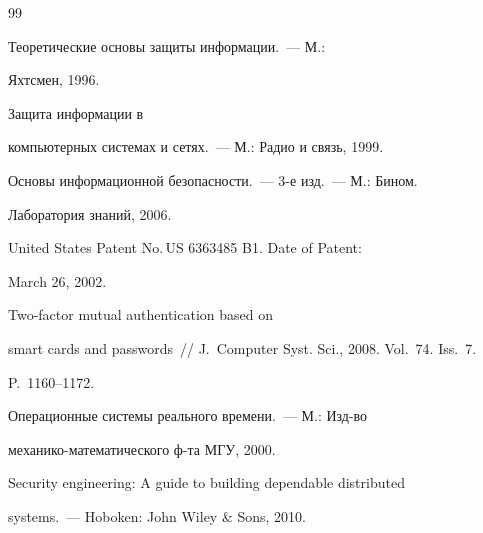 {\small\frenchspacing


{%




\begin{thebibliography}{99}


    




 Теоретические основы защиты информации.~--- М.: 


Яхтсмен, 1996.







 Защита информации в 


компьютерных системах и сетях.~--- М.: Радио и связь, 1999.







 Основы информационной безопасности.~--- 3-е изд.~--- М.: Бином. 


Лаборатория знаний, 2006. 







 United States Patent No.\,US 6363485 B1. Date of Patent: 


March 26, 2002.




 Two-factor mutual authentication based on 


smart cards and passwords~/\!\!/ J.~Computer Syst. Sci., 2008. Vol.~74. Iss.~7. 


P.~1160--1172.




 Операционные системы реального времени.~--- М.: Изд-во 


механико-математического ф-та МГУ, 2000.




 Security engineering: A guide to building dependable distributed 


systems.~--- Hoboken: John Wiley \& Sons, 2010.





\end{thebibliography}}}
